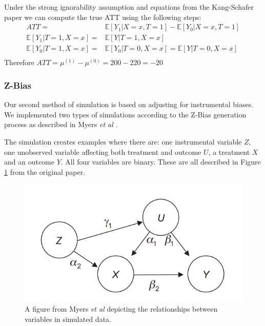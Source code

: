 \documentclass{article}
\begin{document}
Under the strong ignorability assumption and equations from the Kang-Schafer paper we can compute the true ATT using the following steps:
\begin{equation*}
    \begin{split}
        ATT = & \mathbb{E}[Y_1 | X=x, T=1] - \mathbb{E}[Y_0 | X=x, T=1] \\
        \mathbb{E}[Y_1|T=1, X=x] = & \mathbb{E}[Y|T=1, X=x] \\
        \mathbb{E}[Y_0|T=1, X=x] = & \mathbb{E}[Y_0|T=0, X=x] = \mathbb{E}[Y|T=0, X=x] \\
    \end{split}
\end{equation*}
Therefore $ATT=\mu{}^{(1)} - \mu{}^{(0)} = 200-220 = -20$ 

\subsubsection{Z-Bias}
Our second method of simulation is based on adjusting for instrumental biases. We implemented two types of simulations according to the Z-Bias generation process as described in Myers \textit{et al} \cite{myers2011effects}.

The simulation creates examples where there are: one instrumental variable $Z$, one unobserved variable affecting both treatment and outcome $U$, a treatment $X$ and an outcome $Y$. All four variables are binary. These are all described in Figure \ref{fig:z_bias_explanation} from the original paper.

\begin{figure}
    \centering
    \includegraphics[width=\textwidth]{Paper/images/z_bias_schema_complex.png}
    \caption{A figure from Myers \textit{et al} depicting the relationships between variables in simulated data.}
    \label{fig:z_bias_explanation}
\end{figure} 
\end{document}
